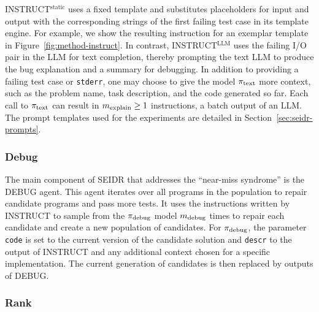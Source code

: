 INSTRUCT$^{\text{static}}$ uses a fixed template and substitutes placeholders for input and output with the corresponding strings of the first failing test case in its template engine.
For example, we show the resulting instruction for an exemplar template in Figure~\ref{fig:method-instruct}.
In contrast, INSTRUCT$^{\text{LLM}}$ uses the failing I/O pair in the LLM for text completion, thereby prompting the text LLM to produce the bug explanation and a summary for debugging. 
In addition to providing a failing test case or \texttt{stderr}, one may choose to give the model $ \pi_\text{text} $ more context, such as the problem name, task description, and the code generated so far. 
Each call to $ \pi_\text{text} $ can result in $m_\text{explain}\ge1$ instructions, a batch output of an LLM.
The prompt templates used for the experiments are detailed in Section~\ref{sec:seidr-prompts}.


\subsubsection{Debug}

The main component of SEIDR that addresses the ``near-miss syndrome'' is the DEBUG agent.  
This agent iterates over all programs in the population to repair candidate programs and pass more tests. 
It uses the instructions written by INSTRUCT to sample from the $ \pi_\text{debug} $ model $m_\text{debug}$ times
to repair each candidate and create a new population of \treearity{} candidates.
For $ \pi_\text{debug} $, the parameter \texttt{code} is set to the current version of the candidate solution and \texttt{descr} to the output of INSTRUCT and any additional context chosen for a specific implementation.
The current generation of candidates is then replaced by \treearity{} outputs of DEBUG.

\subsubsection{Rank}

